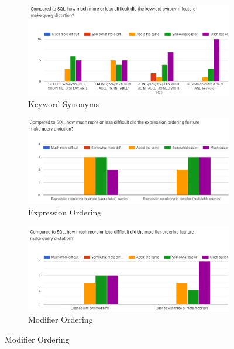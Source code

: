 \begin{figure}
  \centering
  \begin{subfigure}[b]{\linewidth}
    \centering
    \includegraphics[width=\linewidth]{figures/survey-feedback/10-21-22-kw-synonym.png}
    \caption{Keyword Synonyms}
  \end{subfigure}
  \begin{subfigure}[b]{\linewidth}
    \centering
    \includegraphics[width=\linewidth]{figures/survey-feedback/10-21-22-expr-ordering.png}
    \caption{Expression Ordering}
  \end{subfigure}
  \begin{subfigure}[b]{\linewidth}
    \centering
    \includegraphics[width=\linewidth]{figures/survey-feedback/10-21-22-modifier-ordering.png}
    \caption{Modifier Ordering}
  \end{subfigure}

\end{figure}
